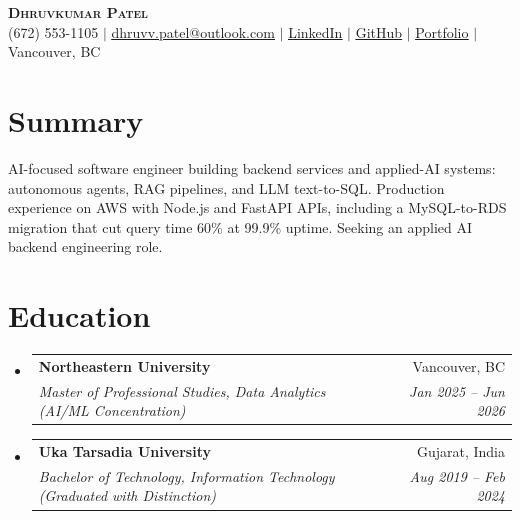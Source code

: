 \documentclass[letterpaper,11pt]{article}
\makeatletter
\newcommand{\resumeSubheading}[4]{
  \vspace{-2pt}\item
    \begin{tabular*}{0.97\textwidth}[t]{l@{\extracolsep{\fill}}r}
      \textbf{#1} & #2 \\
      \textit{\small#3} & \textit{\small #4} \\
    \end{tabular*}\vspace{-7pt}
}
\newcommand{\resumeSubHeadingListStart}{\begin{itemize}[leftmargin=0.15in, label={}]}
\newcommand{\resumeSubHeadingListEnd}{\end{itemize}}
\makeatother
\begin{document}
\begin{center}
    \textbf{\Huge \scshape Dhruvkumar Patel} \\ \vspace{1pt}
    \small (672) 553-1105 $|$ \href{mailto:dhruvv.patel@outlook.com}{\underline{dhruvv.patel@outlook.com}} $|$
    \href{https://www.linkedin.com/in/dhruvkumarpatell/}{\underline{LinkedIn}} $|$
    \href{https://github.com/pateldhruvkumar}{\underline{GitHub}} $|$
    \href{https://dhruvvkumarpatel.vercel.app/}{\underline{Portfolio}} $|$
    Vancouver, BC
\end{center}

\section{Summary}
  \small{AI-focused software engineer building backend services and applied-AI systems: autonomous agents, RAG pipelines, and LLM text-to-SQL. Production experience on AWS with Node.js and FastAPI APIs, including a MySQL-to-RDS migration that cut query time 60\% at 99.9\% uptime. Seeking an applied AI backend engineering role.}
  \vspace{-4pt}

\section{Education}
  \resumeSubHeadingListStart
    \resumeSubheading
      {Northeastern University}{Vancouver, BC}
      {Master of Professional Studies, Data Analytics (AI/ML Concentration)}{Jan 2025 -- Jun 2026}
    \resumeSubheading
      {Uka Tarsadia University}{Gujarat, India}
      {Bachelor of Technology, Information Technology (Graduated with Distinction)}{Aug 2019 -- Feb 2024}
  \resumeSubHeadingListEnd

\end{document}

